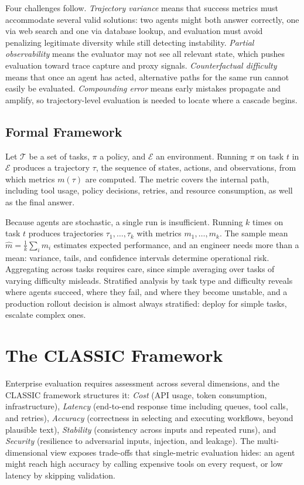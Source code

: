 \documentclass[11pt]{book}
\begin{document}
Four challenges follow. \textit{Trajectory variance} means that success metrics must accommodate several valid solutions: two agents might both answer correctly, one via web search and one via database lookup, and evaluation must avoid penalizing legitimate diversity while still detecting instability. \textit{Partial observability} means the evaluator may not see all relevant state, which pushes evaluation toward trace capture and proxy signals. \textit{Counterfactual difficulty} means that once an agent has acted, alternative paths for the same run cannot easily be evaluated. \textit{Compounding error} means early mistakes propagate and amplify, so trajectory-level evaluation is needed to locate where a cascade begins.

\subsection{Formal Framework}

Let $\mathcal{T}$ be a set of tasks, $\pi$ a policy, and $\mathcal{E}$ an environment. Running $\pi$ on task $t$ in $\mathcal{E}$ produces a trajectory $\tau$, the sequence of states, actions, and observations, from which metrics $m(\tau)$ are computed. The metric covers the internal path, including tool usage, policy decisions, retries, and resource consumption, as well as the final answer.

Because agents are stochastic, a single run is insufficient. Running $k$ times on task $t$ produces trajectories $\tau_1, \ldots, \tau_k$ with metrics $m_1, \ldots, m_k$. The sample mean $\hat{m} = \frac{1}{k}\sum_i m_i$ estimates expected performance, and an engineer needs more than a mean: variance, tails, and confidence intervals determine operational risk. Aggregating across tasks requires care, since simple averaging over tasks of varying difficulty misleads. Stratified analysis by task type and difficulty reveals where agents succeed, where they fail, and where they become unstable, and a production rollout decision is almost always stratified: deploy for simple tasks, escalate complex ones.

\section{The CLASSIC Framework}

Enterprise evaluation requires assessment across several dimensions, and the CLASSIC framework \cite{classic2025} structures it: \textit{Cost} (API usage, token consumption, infrastructure), \textit{Latency} (end-to-end response time including queues, tool calls, and retries), \textit{Accuracy} (correctness in selecting and executing workflows, beyond plausible text), \textit{Stability} (consistency across inputs and repeated runs), and \textit{Security} (resilience to adversarial inputs, injection, and leakage). The multi-dimensional view exposes trade-offs that single-metric evaluation hides: an agent might reach high accuracy by calling expensive tools on every request, or low latency by skipping validation.
\end{document}
